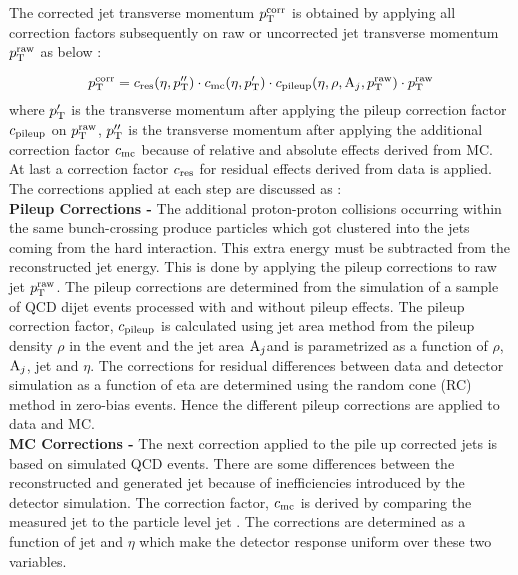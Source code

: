 The corrected jet transverse momentum $p^{\rm corr}_{\rm T}$ is obtained by applying all correction factors subsequently on raw or uncorrected jet transverse momentum $p^{\rm raw}_{\rm T}$ as below :

\begin{equation}
p^{\rm corr}_{\rm T} = c_{\rm res}(\eta,p''_{\rm T})\cdot c_{\rm mc}(\eta,p'_{\rm T})\cdot c_{\rm pileup}(\eta,\rho,{\rm A}_{j},p^{\rm raw}_{\rm T})\cdot p^{\rm raw}_{\rm T}
\end{equation}
where $p'_{\rm T}$ is the transverse momentum after applying the pileup correction factor $c_{\rm pileup}$ on $p^{\rm raw}_{\rm T}$, $p''_{\rm T}$ is the transverse momentum after applying the additional correction factor $c_{\rm mc}$ because of relative and absolute effects derived from MC. At last a correction factor $c_{\rm res}$ for residual effects derived from data is applied. The corrections applied at each step are discussed as : \\\newline
{\bf Pileup Corrections -} The additional proton-proton collisions occurring within the same bunch-crossing produce particles which got clustered into the jets coming from the hard interaction. This extra energy must be subtracted from the reconstructed jet energy. This is done by applying the pileup corrections to raw jet $p^{\rm raw}_{\rm T}$. The pileup corrections are determined from the simulation of a sample of QCD dijet events processed with and without pileup effects. The pileup correction factor, $c_{\rm pileup}$ is calculated using jet area method from the pileup density $\rho$ in the event and the jet area ${\rm A}_{j}$and is parametrized as a function of $\rho$, ${\rm A}_{j}$, jet \pt and $\eta$. The corrections for residual differences between data and detector simulation as a function of eta are determined using the random cone (RC) method in zero-bias events. Hence the different pileup corrections are applied to data and MC. \\ \newline
{\bf MC Corrections -} The next correction applied to the pile up corrected jets is based on simulated QCD events. There are some differences between the reconstructed and generated jet \pt because of inefficiencies introduced by the detector simulation. The correction factor, $c_{\rm mc}$ is derived by comparing the measured jet \pt to the particle level jet \pt. The corrections are determined as a function of jet \pt and $\eta$ which make the detector response uniform over these two variables. \\ \newline

